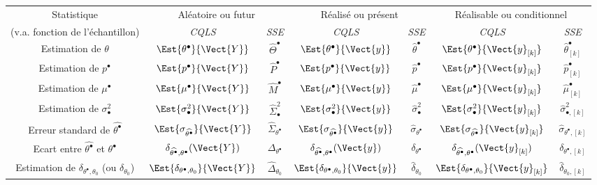 \documentclass[10pt]{article}
\begin{document}
\begin{itemize}
\hspace*{-0.5cm}\begin{tabular}{|c|c|c|c|c|c|c|}\hline
Statistique & \multicolumn{2}{c|}{Aléatoire  ou futur} & \multicolumn{2}{c|}{Réalisé ou présent} &  \multicolumn{2}{c|}{Réalisable ou  conditionnel}\\ 
(v.a. fonction de l'échantillon) & \textit{CQLS} & \textit{SSE} & \textit{CQLS} & \textit{SSE} & \textit{CQLS} & \textit{SSE}\\\hline 
Estimation de $\theta$ & $\Est{\theta^\bullet}{\Vect{Y}}$ & $\widehat{\Theta}^\bullet$ & $\Est{\theta^\bullet}{\Vect{y}}$ & $\widehat{\theta}^\bullet$& $\Est{\theta^\bullet}{\Vect{y}_{[k]}}$ & $\widehat{\theta}^\bullet_{[k]}$ \\
Estimation de $p^\bullet$ & $\Est{p^\bullet}{\Vect{Y}}$ & $\widehat{P}^\bullet$ & $\Est{p^\bullet}{\Vect{y}}$ & $\widehat{p}^\bullet$ & $\Est{p^\bullet}{\Vect{y}_{[k]}}$ & $\widehat{p}^\bullet_{[k]}$\\
Estimation de $\mu^\bullet$ & $\Est{\mu^\bullet}{\Vect{Y}}$& $\widehat{M}^\bullet$& $\Est{\mu^\bullet}{\Vect{y}}$& $\widehat{\mu}^\bullet$ & $\Est{\mu^\bullet}{\Vect{y}_{[k]}}$& $\widehat{\mu}^\bullet_{[k]}$\\
Estimation de $\sigma_\bullet^2$ & $\Est{\sigma_\bullet^2}{\Vect{Y}}$& $\widehat{\Sigma}_\bullet^2$& $\Est{\sigma_\bullet^2}{\Vect{y}}$& $\widehat{\sigma}_\bullet^2$ & $\Est{\sigma_\bullet^2}{\Vect{y}_{[k]}}$& $\widehat{\sigma}_{\bullet,{[k]}}^2$\\\hline
Erreur standard de $\widehat{\theta^\bullet}$ & $\Est{\sigma_{\widehat{\theta^\bullet}}}{\Vect{Y}}$  & $\widehat{\Sigma}_{\theta^\bullet}$ & $\Est{\sigma_{\widehat{\theta^\bullet}}}{\Vect{y}}$  & $\widehat{\sigma}_{\theta^\bullet}$ & $\Est{\sigma_{\widehat{\theta^\bullet}}}{\Vect{y}_{[k]}}$  & $\widehat{\sigma}_{\theta^\bullet,{[k]}}$ \\\hline
Ecart entre $\widehat{\theta^\bullet}$ et $\theta^\bullet$ & $\delta_{\widehat{\theta^\bullet},\theta^\bullet}(\Vect{Y})$ & $\Delta_{\theta^\bullet}$ & $\delta_{\widehat{\theta^\bullet},\theta^\bullet}(\Vect{y})$ & $\delta_{\theta^\bullet}$ & $\delta_{\widehat{\theta^\bullet},\theta^\bullet}(\Vect{y}_{[k]})$ & $\delta_{\theta^\bullet,{[k]}}$ \\\hline
Estimation de $\delta_{\theta^\bullet,\theta_0}$ (ou $\delta_{\theta_0}$) & $\Est{\delta_{\theta^\bullet,\theta_0}}{\Vect{Y}}$ & $\widehat{\Delta}_{\theta_0}$ & $\Est{\delta_{\theta^\bullet,\theta_0}}{\Vect{y}}$ & $\widehat{\delta}_{\theta_0}$ & $\Est{\delta_{\theta^\bullet,\theta_0}}{\Vect{y}_{[k]}}$ & $\widehat{\delta}_{\theta_0,{[k]}}$ \\\hline

\end{tabular}
\end{itemize}
\end{document}

